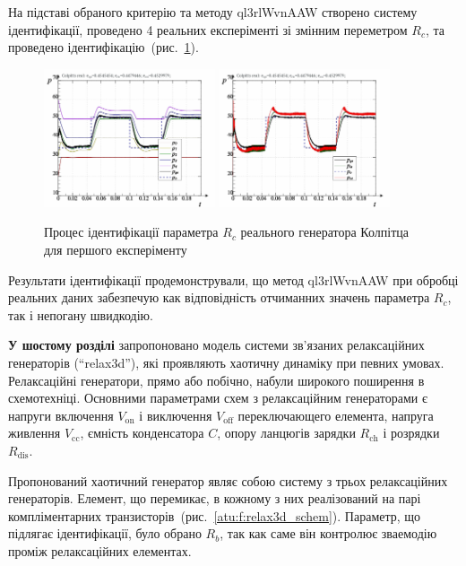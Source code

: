 \documentclass[a4paper,13pt]{atuaref}
\newcommand{\Tidx}[1]{%
  _\mathrm{#1}
}
\begin{document}
На підставі обраного критерію та методу ql3rlWvnAAW створено систему ідентифікації,
проведено 4 реальних експеріменті зі змінним переметром $R_c$,
та проведено ідентифікацію~(рис.~\ref{atu:f:colp_r_id_1}).

\begin{figure}[htb!]
  \centerline{
    \includegraphics[width=0.45\textwidth]{p6/p/colp_real_id_qi_fv5-p_p_01.png}
    \hfill
    \includegraphics[width=0.45\textwidth]{p6/p/colp_real_id_qi_fv5-p_pp_01.png}
  }
  \caption{Процес ідентифікації параметра $ R_c $ реального генератора Колпітца для першого експеріменту}
  \label{atu:f:colp_r_id_1}
\end{figure}

Результати ідентифікації продемонстрували, що метод ql3rlWvnAAW
при обробці реальних даних забезпечую как відповідність отчиманних значень параметра $R_c$,
так і непогану швидкодію.



\textbf{У шостому розділі}
запропоновано модель
системи зв'язаних релаксаційних генераторів (``relax3d''),
які проявляють хаотичну динаміку при певних умовах.
Релаксаційні генератори, прямо або побічно, набули широкого поширення в схемотехніці.
Основними параметрами схем з релаксаційним генераторами є напруги включення
$ V\Tidx{on} $ і виключення $ V \Tidx{off} $ переключающего елемента,
напруга живлення $ V\Tidx{cc} $, ємність конденсатора $C$, опору ланцюгів
зарядки $ R\Tidx{ch} $ і розрядки $ R\Tidx {dis} $.

Пропонований хаотичний генератор являє собою систему з трьох релаксаційних
генераторів. Елемент, що перемикає, в кожному з них реалізований на парі
компліментарних транзисторів~(рис.~\ref{atu:f:relax3d_schem}).
Параметр, що підлягає ідентифікації, було обрано $R_b$,
так как саме він контролює зваемодію проміж релаксаційних елементах.
\end{document}
